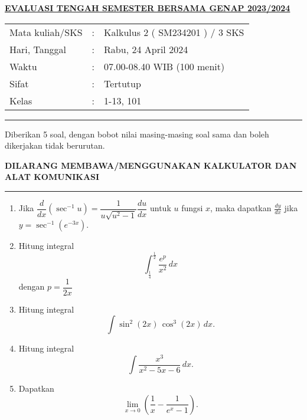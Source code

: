 \documentclass[11pt,openany,a4paper]{article}
\begin{document}
\pagestyle{problems}
    \begin{center}
	{\underline{\textbf{\MakeUppercase{Evaluasi Tengah Semester Bersama Genap 2023/2024}}}}
    \end{center}

    \begin{center}
	\begin{tabular}{lcl}
		Mata kuliah/SKS & : & Kalkulus 2 ( SM234201 ) / 3 SKS\\
		Hari, Tanggal & : & Rabu, 24 April 2024\\
		Waktu & : & 07.00-08.40 WIB (100 menit)\\
		Sifat & : & Tertutup\\
		Kelas & : & 1-13, 101
	\end{tabular}
    \end{center}
	
    \noindent\rule{\textwidth}{2.pt}
	
    \setlength{\parindent}{5pt}
    \par Diberikan 5 soal, dengan bobot nilai masing-masing soal sama dan boleh dikerjakan tidak berurutan.
    \setlength{\parindent}{5pt}
    \setlength{\parindent}{5pt}
    {\small
    \par \textbf{\MakeUppercase{Dilarang membawa/menggunakan kalkulator dan alat komunikasi}}
    }
    \par {}
	
    \noindent\rule{\textwidth}{2.pt}
	
\begin{enumerate}
  \item
    Jika 
    $
      \dfrac{d}{dx}\left(\sec^{-1}u\right)
      = \dfrac{1}{u\sqrt{u^2-1}}\dfrac{du}{dx}
    $
    untuk \(u\) fungsi \(x\), maka dapatkan \(\displaystyle \frac{dy}{dx}\) jika 
    $
      y = \sec^{-1}\left(e^{-3x}\right).
    $
    
  \item Hitung integral
    \[
      \int_{\frac14}^{\frac12} \frac{e^p}{x^2}\,dx
    \]
    dengan $p=\dfrac{1}{2x}$
    
  \item Hitung integral
    \[
      \int \sin^2(2x)\,\cos^3(2x)\,dx.
    \]
    
  \item Hitung integral
    \[
      \int \frac{x^3}{x^2 - 5x - 6}\,dx.
    \]
    
  \item Dapatkan
    \[
      \lim_{x\to 0}\left(\frac{1}{x} - \frac{1}{e^x - 1}\right).
    \]
\end{enumerate}
	
\end{document}
